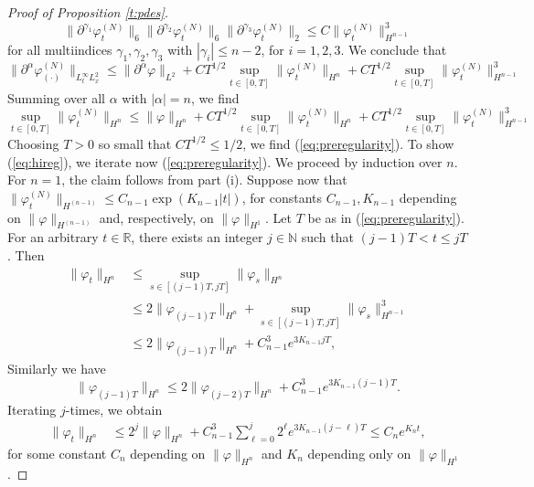 \documentclass[11pt,a4paper,DIV11]{scrartcl}	%
\newcommand{\bR}{{\mathbb R}}
\newcommand{\bN}{{\mathbb N}}
\begin{document}
\begin{proof}[Proof of Proposition \ref{t:pdes}]
\[  \| \partial^{\gamma_1} \varphi_t^{(N)} \|_{6} \| \partial^{\gamma_2} \varphi_t^{(N)} \|_6 \| \partial^{\gamma_3} \varphi_t^{(N)} \|_2 \leq C \| \varphi_t^{(N)} \|_{H^{n-1}}^3 \]
for all multiindices $\gamma_1, \gamma_2, \gamma_3$ with $|\gamma_i| \leq n-2$, for $i=1,2,3$. We conclude that
\[ \| \partial^\alpha \varphi^{(N)}_{(\cdot)} \|_{L_t^\infty L_x^2} \leq  \|
    \partial^\alpha \varphi \|_{L^2} + C T^{1/2} \sup_{t \in [0,T]} \| \varphi_t^{(N)} \|_{H^n} + C T^{1/2} \sup_{t \in [0,T]} \| \varphi_t^{(N)} \|_{H^{n-1}}^3 \]   
Summing over all $\alpha$ with $|\alpha| =n$, we find
\[ \sup_{t \in [0,T]} \| \varphi^{(N)}_{t} \|_{H^n} \leq  \| \varphi \|_{H^n} + C T^{1/2} \sup_{t \in [0,T]} \| \varphi_t^{(N)} \|_{H^n} + C T^{1/2} \sup_{t \in [0,T]} \| \varphi_t^{(N)} \|_{H^{n-1}}^3 \]  
Choosing $T > 0$ so small that $CT^{1/2} \leq 1/2$, we find (\ref{eq:preregularity}). To show (\ref{eq:hireg}), we iterate now (\ref{eq:preregularity}). We proceed by induction over $n$. For $n =1$, the claim follows from part (i). Suppose now that $\| \varphi^{(N)}_t \|_{H^{(n-1)}} \leq C_{n-1} \exp (K_{n-1} |t|)$, for constants $C_{n-1}, K_{n-1}$ depending on $\| \varphi \|_{H^{(n-1)}}$ and, respectively, on $\| \varphi \|_{H^1}$. Let $T$ be as in (\ref{eq:preregularity}). For an arbitrary $t \in \bR$, there exists an integer $j \in \bN$ such that $(j-1) T < t \leq jT$. Then
  \begin{align*}
    \| \varphi_t \|_{H^n} & \le \sup_{s \in [(j-1)T, jT]} \| \varphi_s
    \|_{H^n} \\
    & \le 2 \| \varphi_{(j-1)T} \|_{H^n} + \sup_{s \in [(j-1)T, jT]} \|
    \varphi_s \|_{H^{n-1}}^3 \\
    & \le 2 \| \varphi_{(j-1)T} \|_{H^n} + C_{n-1}^3 e^{3 K_{n-1} j T},
  \end{align*}
Similarly we have
  \[
    \| \varphi_{(j-1)T} \|_{H^n} \le 2 \|
    \varphi_{(j-2)T} \|_{H^n} + C_{n-1}^3  e^{3 K_{n-1} (j-1)T}.
  \]
Iterating $j$-times, we obtain
  \begin{align*}
    \| \varphi_t \|_{H^n} & \le 2^j \| \varphi \|_{H^n} + C_{n-1}^3
    \sum_{\ell=0}^j 2^{\ell} e^{3 K_{n-1} (j-\ell)T} \le C_n e^{K_n t},
  \end{align*}
  for some constant $C_n$ depending on $\| \varphi \|_{H^n}$ and $K_n$ depending only on $\| \varphi \|_{H^1}$.


\end{proof}
\end{document}
